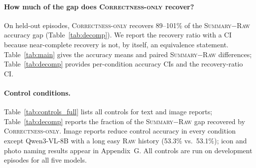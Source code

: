 \documentclass[letterpaper]{article} %
\newcommand{\Raw}{\textsc{Raw}}
\newcommand{\CorrectnessOnly}{\textsc{Correctness-only}}
\newcommand{\Summary}{\textsc{Summary}}
\begin{document}
\paragraph{How much of the gap does \CorrectnessOnly{} recover?} On held-out episodes, \CorrectnessOnly{} recovers 89--101\% of the \Summary{}$-$\Raw{} accuracy gap (Table~\ref{tab:decomp}). We report the recovery ratio with a CI because near-complete recovery is not, by itself, an equivalence statement. Table~\ref{tab:main} gives the accuracy means and paired \Summary{}$-$\Raw{} differences; Table~\ref{tab:decomp} provides per-condition accuracy CIs and the recovery-ratio CI.

\paragraph{Control conditions.} Table~\ref{tab:controls_full} lists all controls for text and image reports; Table~\ref{tab:decomp} reports the fraction of the \Summary{}$-$\Raw{} gap recovered by \CorrectnessOnly{}. Image reports reduce control accuracy in every condition except Qwen3-VL-8B with a long easy \Raw{} history (53.3\% vs.\ 53.1\%); icon and photo naming results appear in Appendix~G. All controls are run on development episodes for all five models.
\end{document}
